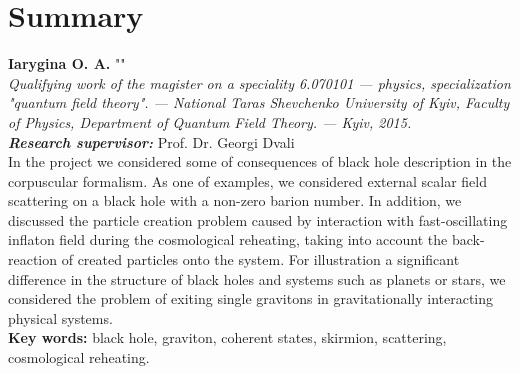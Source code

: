 \section*{Summary}

  {\bf Iarygina O. A.} "\thesistopicEN"\\
  {\itshape Qualifying work of the magister on a speciality 6.070101 --- physics, specialization "quantum field theory". --- National Taras Shevchenko University of Kyiv, Faculty of Physics, Department of Quantum Field Theory. --- Kyiv, 2015.\\}
  {\itshape \bfseries Research supervisor:}  Prof. Dr. Georgi Dvali \\%

In the project we considered some of consequences of black hole description in the corpuscular formalism. As one of examples, we considered external scalar field scattering on a black hole with a non-zero barion number. In addition, we discussed the particle creation problem caused by interaction with fast-oscillating inflaton field during the cosmological reheating, taking into account the back-reaction of created particles onto the system. For illustration a significant difference in the structure of black holes and systems such as planets or stars, we considered the problem of exiting single gravitons in gravitationally interacting physical systems. \\[0.5cm]
 {\bf Key words:} black hole, graviton, coherent states, skirmion, scattering, cosmological reheating.\\
